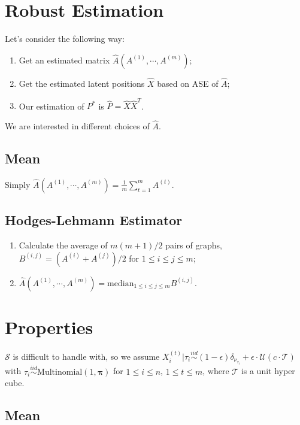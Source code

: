\documentclass[a4paper]{article}
\begin{document}
\section{Robust Estimation}

Let's consider the following way:
\begin{enumerate}
\item Get an estimated matrix $\widehat{A}(A^{(1)}, \cdots, A^{(m)})$;
\item Get the estimated latent positions $\widehat{X}$ based on ASE of $\widehat{A}$;
\item Our estimation of $P^*$ is $\widehat{P} = \widehat{X} \widehat{X}^T$.
\end{enumerate}

We are interested in different choices of $\widehat{A}$.

\subsection{Mean}

Simply $\widehat{A}(A^{(1)}, \cdots, A^{(m)}) = \frac{1}{m} \sum_{t = 1}^m A^{(t)}$.

\subsection{Hodges-Lehmann Estimator}

\begin{enumerate}
\item Calculate the average of $m(m+1)/2$ pairs of graphs,
$B^{(i,j)} = \left( A^{(i)} + A^{(j)}\right)/2$ for $1 \le i \le j \le m$;
\item $\widehat{A}(A^{(1)}, \cdots, A^{(m)}) = \text{median}_{1 \le i \le j \le m} B^{(i,j)}$.
\end{enumerate}



\section{Properties}

$\mathcal{S}$ is difficult to handle with, so we assume
$X_i^{(t)} | \tau_i \stackrel{iid}{\sim} (1 - \epsilon) \delta_{\nu_{\tau_i}} + \epsilon \cdot \mathcal{U}\left( c \cdot \mathcal{T} \right)$ with $\tau_i \stackrel{iid}{\sim} \text{Multinomial} (1, \boldsymbol{\pi}) $ for $1 \le i \le n$, $1 \le t \le m$, where $\mathcal{T}$ is a unit hyper cube.


\subsection{Mean}
\end{document}
